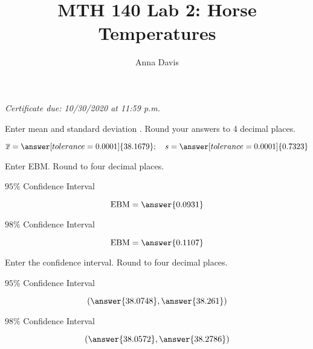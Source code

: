 \documentclass{ximera}
\author{Anna Davis} \title{MTH 140 Lab 2: Horse Temperatures}
\begin{document}
\begin{abstract}

\end{abstract}
\maketitle
 \textit{Certificate due: 10/30/2020 at 11:59 p.m.}
\begin{problem}\label{prob:140lab2prob1}
Enter mean and standard deviation .  Round your answers to 4 decimal places.

$$\overline{x}=\answer[tolerance=0.0001]{38.1679};\quad s=\answer[tolerance=0.0001]{0.7323}$$
\end{problem}

\begin{problem}\label{prob:140lab2prob2}
Enter EBM.  Round to four decimal places.
\begin{center}
$95\%$ Confidence Interval 
\end{center}

$$\mbox{EBM}=\answer{0.0931}$$

\begin{center}
$98\%$ Confidence Interval 
\end{center}

$$\mbox{EBM}=\answer{0.1107}$$

\end{problem}

\begin{problem}\label{prob:140lab2prob3}
Enter the confidence interval.  Round to four decimal places.
\begin{center}
$95\%$ Confidence Interval 
\end{center}

$$(\answer{38.0748},\answer{38.261})$$

\begin{center}
$98\%$ Confidence Interval 
\end{center}

$$(\answer{38.0572},\answer{38.2786})$$

\end{problem}
\end{document}
